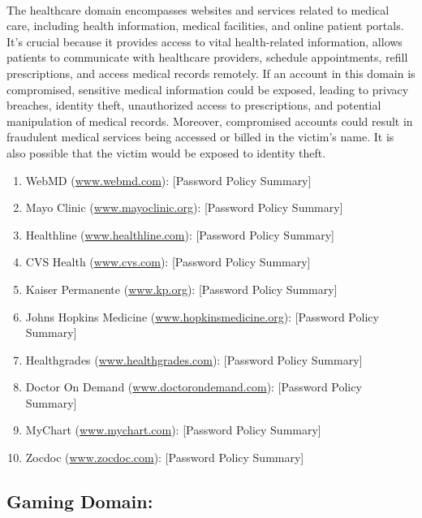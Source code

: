 \documentclass{article}
\begin{document}
\paragraph{} The healthcare domain encompasses websites and services related to medical care, including health information, medical facilities, and online patient portals. It's crucial because it provides access to vital health-related information, allows patients to communicate with healthcare providers, schedule appointments, refill prescriptions, and access medical records remotely. If an account in this domain is compromised, sensitive medical information could be exposed, leading to privacy breaches, identity theft, unauthorized access to prescriptions, and potential manipulation of medical records. Moreover, compromised accounts could result in fraudulent medical services being accessed or billed in the victim's name. It is also possible that the victim would be exposed to identity theft.
\begin{enumerate}
    \item WebMD (\url{www.webmd.com}): [Password Policy Summary]
    \item Mayo Clinic (\url{www.mayoclinic.org}): [Password Policy Summary]
    \item Healthline (\url{www.healthline.com}): [Password Policy Summary]
    \item CVS Health (\url{www.cvs.com}): [Password Policy Summary]
    \item Kaiser Permanente (\url{www.kp.org}): [Password Policy Summary]
    \item Johns Hopkins Medicine (\url{www.hopkinsmedicine.org}): [Password Policy Summary]
    \item Healthgrades (\url{www.healthgrades.com}): [Password Policy Summary]
    \item Doctor On Demand (\url{www.doctorondemand.com}): [Password Policy Summary]
    \item MyChart (\url{www.mychart.com}): [Password Policy Summary]
    \item Zocdoc (\url{www.zocdoc.com}): [Password Policy Summary]
\end{enumerate}

\subsection*{Gaming Domain:}
\end{document}
